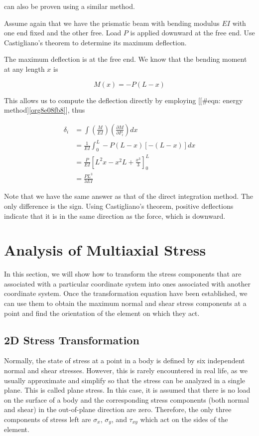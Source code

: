 \documentclass[a4paper,openany,12pt]{book}
\begin{document}
\begin{enumerate}
can also be proven using a similar method.

Assume again that we have the prismatic beam with bending modulus \(EI\)
with one end fixed and the other free. Load \(P\) is applied downward at
the free end. Use Castigliano's theorem to determine its maximum
deflection.

The maximum deflection is at the free end. We know that the bending
moment at any length \(x\) is

$$M(x) =  - P(L - x)$$

This allows us to compute the deflection directly by employing
[[\#eqn: energy method]\ref{org8e08fb8}], thus

$$\begin{aligned}
  \delta_i &= \int \left( \frac{M}{EI} \right) \left( \frac{\partial M}{\partial P_i} \right)dx \\ 
              &= \frac{1}{EI}\int_0^L  - P(L - x)[ - (L - x)]dx  \\ 
              &= \frac{P}{EI}\left[ L^2x - x^2L + \frac{x^3}{3} \right]_0^L \\ 
              &= \frac{PL^3}{3EI} \end{aligned}$$

Note that we have the same answer as that of the direct integration
method. The only difference is the sign. Using Castigliano's theorem,
positive deflections indicate that it is in the same direction as the
force, which is downward.
\end{enumerate}

\section{Analysis of Multiaxial Stress}
\label{sec:org198112e}
In this section, we will show how to transform the stress components
that are associated with a particular coordinate system into ones
associated with another coordinate system. Once the transformation
equation have been established, we can use them to obtain the maximum
normal and shear stress components at a point and find the orientation
of the element on which they act.

\subsection{2D Stress Transformation}
\label{sec:org5dd3edb}
Normally, the state of stress at a point in a body is defined by six
independent normal and shear stresses. However, this is rarely
encountered in real life, as we usually approximate and simplify so that
the stress can be analyzed in a single plane. This is called plane
stress. In this case, it is assumed that there is no load on the surface
of a body and the corresponding stress components (both normal and
shear) in the out-of-plane direction are zero. Therefore, the only three
components of stress left are \(\sigma_x\), \(\sigma_y\), and \(\tau_{xy}\)
which act on the sides of the element.
\end{document}
